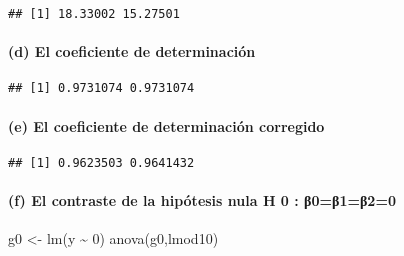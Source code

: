\documentclass[
]{article}
\newenvironment{Shaded}{\begin{snugshade}}{\end{snugshade}}
\newcommand{\DecValTok}[1]{\textcolor[rgb]{0.00,0.00,0.81}{#1}}
\newcommand{\FunctionTok}[1]{\textcolor[rgb]{0.00,0.00,0.00}{#1}}
\newcommand{\NormalTok}[1]{#1}
\newcommand{\OtherTok}[1]{\textcolor[rgb]{0.56,0.35,0.01}{#1}}
\newcommand{\SpecialCharTok}[1]{\textcolor[rgb]{0.00,0.00,0.00}{#1}}
\begin{document}
\begin{verbatim}
## [1] 18.33002 15.27501
\end{verbatim}

\hypertarget{d-el-coeficiente-de-determinaciuxf3n}{%
\paragraph{(d) El coeficiente de
determinación}\label{d-el-coeficiente-de-determinaciuxf3n}}

\begin{Shaded}
\end{Shaded}

\begin{verbatim}
## [1] 0.9731074 0.9731074
\end{verbatim}

\hypertarget{e-el-coeficiente-de-determinaciuxf3n-corregido}{%
\paragraph{(e) El coeficiente de determinación
corregido}\label{e-el-coeficiente-de-determinaciuxf3n-corregido}}

\begin{Shaded}
\end{Shaded}

\begin{verbatim}
## [1] 0.9623503 0.9641432
\end{verbatim}

\hypertarget{f-el-contraste-de-la-hipuxf3tesis-nula-h-0-ux3b20ux3b21ux3b220}{%
\paragraph{(f) El contraste de la hipótesis nula H 0 :
β0=β1=β2=0}\label{f-el-contraste-de-la-hipuxf3tesis-nula-h-0-ux3b20ux3b21ux3b220}}

\begin{Shaded}
\begin{Highlighting}[]
\NormalTok{g0 }\OtherTok{\textless{}{-}} \FunctionTok{lm}\NormalTok{(y }\SpecialCharTok{\textasciitilde{}} \DecValTok{0}\NormalTok{)}
\FunctionTok{anova}\NormalTok{(g0,lmod10)}
\end{Highlighting}
\end{Shaded}
\end{document}
